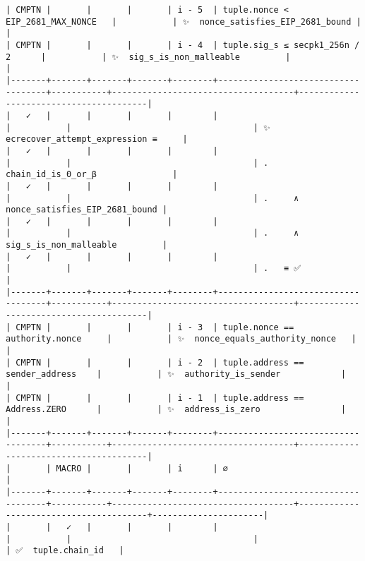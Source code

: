 \documentclass[varwidth=\maxdimen,margin=0.5cm,multi={verbatim}]{standalone}
\begin{document}
\begin{verbatim}
| CMPTN |       |       |       | i - 5  | tuple.nonce < EIP_2681_MAX_NONCE   |           | ✨  nonce_satisfies_EIP_2681_bound |                                        |
| CMPTN |       |       |       | i - 4  | tuple.sig_s ≤ secpk1_256n / 2      |           | ✨  sig_s_is_non_malleable         |                                        |
|-------+-------+-------+-------+--------+------------------------------------+-----------+------------------------------------+----------------------------------------|
|   ✓   |       |       |       |        |                                    |           |                                    | ✨  ecrecover_attempt_expression ≡     |
|   ✓   |       |       |       |        |                                    |           |                                    | .     chain_id_is_0_or_β               |
|   ✓   |       |       |       |        |                                    |           |                                    | .     ∧ nonce_satisfies_EIP_2681_bound |
|   ✓   |       |       |       |        |                                    |           |                                    | .     ∧ sig_s_is_non_malleable         |
|   ✓   |       |       |       |        |                                    |           |                                    | .   ≡ ✅                               |
|-------+-------+-------+-------+--------+------------------------------------+-----------+------------------------------------+----------------------------------------|
| CMPTN |       |       |       | i - 3  | tuple.nonce == authority.nonce     |           | ✨  nonce_equals_authority_nonce   |                                        |
| CMPTN |       |       |       | i - 2  | tuple.address == sender_address    |           | ✨  authority_is_sender            |                                        |
| CMPTN |       |       |       | i - 1  | tuple.address == Address.ZERO      |           | ✨  address_is_zero                |                                        |
|-------+-------+-------+-------+--------+------------------------------------+-----------+------------------------------------+----------------------------------------|
|       | MACRO |       |       | i      | ∅                                  |
|-------+-------+-------+-------+--------+------------------------------------+-----------+------------------------------------+----------------------------------------+----------------------|
|       |   ✓   |       |       |        |                                    |           |                                    |                                        | ✅  tuple.chain_id   |

\end{verbatim}
\end{document}
